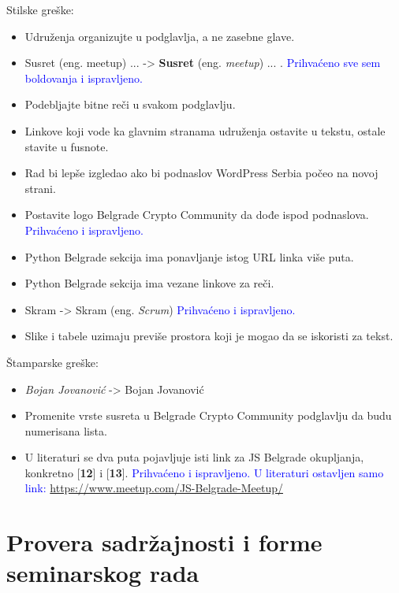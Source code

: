 \documentclass[a4paper]{report}
\newcommand{\odgovor}[1]{\textcolor{blue}{#1}}
\begin{document}
Stilske greške:\begin{itemize}
\item Udruženja organizujte u podglavlja, a ne zasebne glave.
\item Susret (eng. meetup) ... -> \textbf{Susret} (eng. \textit{meetup}) ... .
\odgovor{Prihvaćeno sve sem boldovanja i ispravljeno.}
\item Podebljajte bitne reči u svakom podglavlju.
\item Linkove koji vode ka glavnim stranama udruženja ostavite u tekstu, ostale stavite u fusnote.
\item Rad bi lepše izgledao ako bi podnaslov WordPress Serbia počeo na novoj strani.
\item Postavite logo Belgrade Crypto Community da dođe ispod podnaslova.
\odgovor{Prihvaćeno i ispravljeno.} %
\item Python Belgrade sekcija ima ponavljanje istog URL linka više puta.
\item Python Belgrade sekcija ima vezane linkove za reči.
\item Skram -> Skram (eng. \textit{Scrum})
\odgovor{Prihvaćeno i ispravljeno.}
\item Slike i tabele uzimaju previše prostora koji je mogao da se iskoristi za tekst.
\end{itemize}

Štamparske greške:\begin{itemize}
\item \textit{Bojan Jovanović} -> Bojan Jovanović
\item Promenite vrste susreta u Belgrade Crypto Community podglavlju da budu numerisana lista.
\item U literaturi se dva puta pojavljuje isti link za JS Belgrade okupljanja, konkretno
      [\textbf{12}] i [\textbf{13}].
\odgovor{Prihvaćeno i ispravljeno. U literaturi ostavljen samo link: \url{https://www.meetup.com/JS-Belgrade-Meetup/}}
\end{itemize}



\section{Provera sadržajnosti i forme seminarskog rada}
\end{document}
